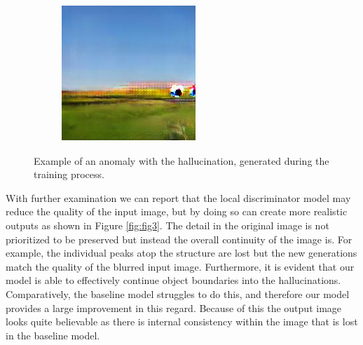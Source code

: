 \documentclass{article}
\begin{document}
\begin{figure}
	\captionsetup[subfigure]{labelformat=empty}
    \centering
    \begin{subfigure}[b]{0.25\textwidth}
        \includegraphics[width=\textwidth]{figs/fig5/fig5}
    \end{subfigure}
  	\caption{Example of an anomaly with the hallucination, generated during the training process.}
  	\label{fig:fig5}
\end{figure}

With further examination we can report that the local discriminator model may reduce the quality of the input image, but by doing so can create more realistic outputs as shown in Figure \ref{fig:fig3}. The detail in the original image is not prioritized to be preserved but instead the overall continuity of the image is. For example, the individual peaks atop the structure are lost but the new generations match the quality of the blurred input image. Furthermore, it is evident that our model is able to effectively continue object boundaries into the hallucinations. Comparatively, the baseline model struggles to do this, and therefore our model provides a large improvement in this regard. Because of this the output image looks quite believable as there is internal consistency within the image that is lost in the baseline model.
\end{document}
